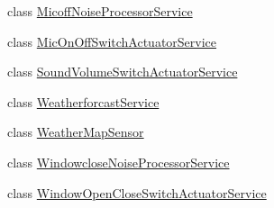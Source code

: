 \begin{DoxyCompactItemize}
\item 
class \hyperlink{classjp_1_1ac_1_1kyoto__u_1_1i_1_1soc_1_1ai_1_1iostbase_1_1service_1_1iot_1_1_micoff_noise_processor_service}{Micoff\-Noise\-Processor\-Service}
\item 
class \hyperlink{classjp_1_1ac_1_1kyoto__u_1_1i_1_1soc_1_1ai_1_1iostbase_1_1service_1_1iot_1_1_mic_on_off_switch_actuator_service}{Mic\-On\-Off\-Switch\-Actuator\-Service}
\item 
class \hyperlink{classjp_1_1ac_1_1kyoto__u_1_1i_1_1soc_1_1ai_1_1iostbase_1_1service_1_1iot_1_1_sound_volume_switch_actuator_service}{Sound\-Volume\-Switch\-Actuator\-Service}
\item 
class \hyperlink{classjp_1_1ac_1_1kyoto__u_1_1i_1_1soc_1_1ai_1_1iostbase_1_1service_1_1iot_1_1_weatherforcast_service}{Weatherforcast\-Service}
\item 
class \hyperlink{classjp_1_1ac_1_1kyoto__u_1_1i_1_1soc_1_1ai_1_1iostbase_1_1service_1_1iot_1_1_weather_map_sensor}{Weather\-Map\-Sensor}
\item 
class \hyperlink{classjp_1_1ac_1_1kyoto__u_1_1i_1_1soc_1_1ai_1_1iostbase_1_1service_1_1iot_1_1_windowclose_noise_processor_service}{Windowclose\-Noise\-Processor\-Service}
\item 
class \hyperlink{classjp_1_1ac_1_1kyoto__u_1_1i_1_1soc_1_1ai_1_1iostbase_1_1service_1_1iot_1_1_window_open_close_switch_actuator_service}{Window\-Open\-Close\-Switch\-Actuator\-Service}
\end{DoxyCompactItemize}

